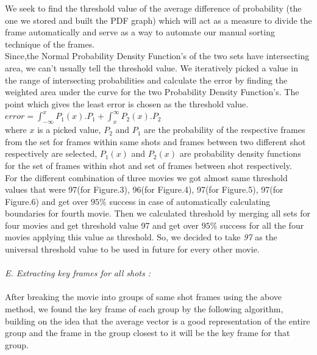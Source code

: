 \documentclass[twocolumn,twoside]{article}
\begin{document}
	 We seek to find the threshold value of the average difference of probability (the one we stored and built the PDF graph) which will act as a measure to divide the frame automatically and serve as a way to automate our manual sorting technique of the frames.\\ 

	Since,the Normal Probability Density Function's of the two sets have intersecting  area, we can't usually tell the threshold value. We iteratively picked a value in the range of intersecting probabilities and calculate the error by finding the weighted area under the curve for the two Probability Density Function's. The point which gives the least error is chosen as the threshold value. \\

$error =  \int_{-\infty}^x P_1\left(x\right) . P_1 + \int_x^{\infty} P_2\left(x\right) . P_2$ \\

\vspace{0.1cm}
where $x$ is a picked value, $P_2$ and $P_1$ are the probability of the respective frames from the set for frames within same shots and frames between two different shot respectively are selected, $P_1\left(x\right)$ and $P_2\left(x\right)$ are probability density functions for the set of frames within shot and set of frames between shot respectively.\\

\vspace{0.1cm}
For the different combination of three movies we got almost same threshold values that were 97(for Figure.3), 96(for Figure.4), 97(for Figure.5), 97(for Figure.6) and get over $95\%$ success in case of automatically calculating boundaries for fourth movie. Then we calculated threshold by merging all sets for four movies and get threshold value 97 and get over $95\%$ success for all the four movies applying this value as threshold. So, we decided to take \emph {97} as the universal threshold value to be used in future for every other movie. \\ \\

		\vspace{0.2cm}
		\textit{E. Extracting key frames for all shots :}\\ \\
		
		After breaking the movie into groups of same shot frames using the above method, we found the key frame of each group by the following algorithm, building on the idea that the average vector is a good representation of the entire group and the frame in the group closest to it will be the key frame for that group. 
\vspace{0.1cm}
\end{document}
